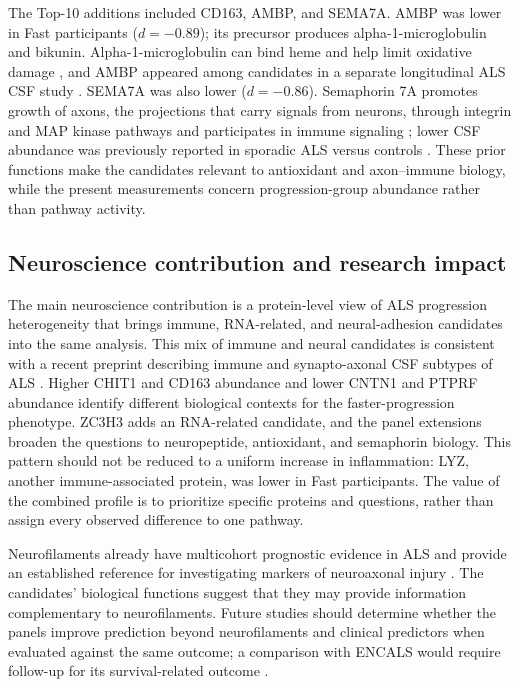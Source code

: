 \documentclass[11pt,letterpaper]{article}
\begin{document}
The Top-10 additions included CD163, AMBP, and SEMA7A. AMBP was lower in Fast participants ($d = -0.89$); its precursor produces alpha-1-microglobulin and bikunin. Alpha-1-microglobulin can bind heme and help limit oxidative damage \citep{olsson2008}, and AMBP appeared among candidates in a separate longitudinal ALS CSF study \citep{vu2023}. SEMA7A was also lower ($d = -0.86$). Semaphorin 7A promotes growth of axons, the projections that carry signals from neurons, through integrin and MAP kinase pathways and participates in immune signaling \citep{pasterkamp2003}; lower CSF abundance was previously reported in sporadic ALS versus controls \citep{collins2015}. These prior functions make the candidates relevant to antioxidant and axon--immune biology, while the present measurements concern progression-group abundance rather than pathway activity.

\subsection{Neuroscience contribution and research impact}

The main neuroscience contribution is a protein-level view of ALS progression heterogeneity that brings immune, RNA-related, and neural-adhesion candidates into the same analysis. This mix of immune and neural candidates is consistent with a recent preprint describing immune and synapto-axonal CSF subtypes of ALS \citep{tzeplaeff2026}. Higher CHIT1 and CD163 abundance and lower CNTN1 and PTPRF abundance identify different biological contexts for the faster-progression phenotype. ZC3H3 adds an RNA-related candidate, and the panel extensions broaden the questions to neuropeptide, antioxidant, and semaphorin biology. This pattern should not be reduced to a uniform increase in inflammation: LYZ, another immune-associated protein, was lower in Fast participants. The value of the combined profile is to prioritize specific proteins and questions, rather than assign every observed difference to one pathway.

Neurofilaments already have multicohort prognostic evidence in ALS and provide an established reference for investigating markers of neuroaxonal injury \citep{lu2015,benatar2020,boylan2013}. The candidates' biological functions suggest that they may provide information complementary to neurofilaments. Future studies should determine whether the panels improve prediction beyond neurofilaments and clinical predictors when evaluated against the same outcome; a comparison with ENCALS would require follow-up for its survival-related outcome \citep{westeneng2018}.
\end{document}
